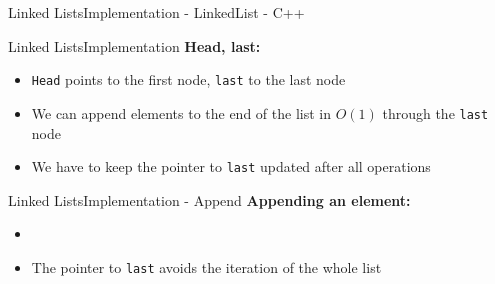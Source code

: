 
\begin{frame}[fragile]{Linked Lists}{Implementation - LinkedList - C++}
  \vspace{-1.25em}
  
\end{frame}


\begin{frame}{Linked Lists}{Implementation}
  \textbf{Head, last:}
    \begin{flushleft}
    
  \end{flushleft}
  \begin{itemize}
    \item<3->
      \texttt{Head} points to the first node, \texttt{last} to the last node
    \item<4->
      We can append elements to the end of the list in $O(1)$ through
      the \texttt{last} node
    \item<5->
      We have to keep the pointer to \texttt{last} updated after all operations
  \end{itemize}
\end{frame}


\begin{frame}[fragile]{Linked Lists}{Implementation - Append}
  \textbf{Appending an element:}
  \begin{flushleft}
    
  \end{flushleft}
  \begin{itemize}
  \item<3->
    \vspace{-1.0em}
      
    \item<4->
      \vspace{-1.0em}
      The pointer to \texttt{last} avoids the iteration of the whole list
  \end{itemize}
\end{frame}

